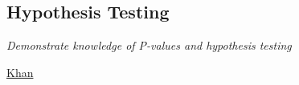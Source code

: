 \subsection[short]{Hypothesis Testing}

\textit{Demonstrate knowledge of P-values and hypothesis testing}

\vspace{1cm}

\href{https://youtu.be/dpGmVV0-4jc}{Khan}